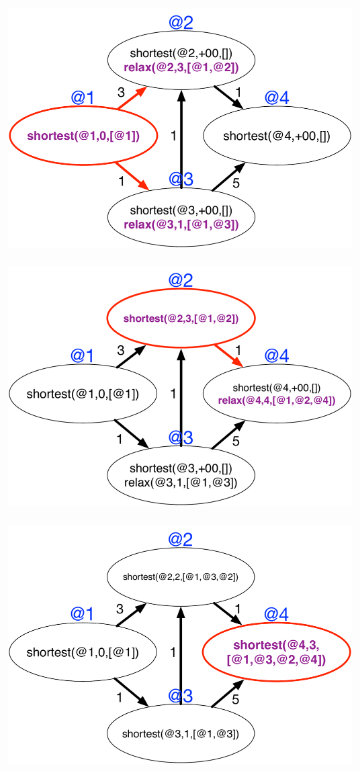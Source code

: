 \begin{figure}
\begin{center}
   \begin{subfigure}[b]{0.49\textwidth}
      \includegraphics[width=\textwidth]{figures/sssp/shortest2}
      \caption{}
   \end{subfigure}
   \begin{subfigure}[b]{0.49\textwidth}
      \includegraphics[width=\textwidth]{figures/sssp/shortest3}
      \caption{}
   \end{subfigure}
   \begin{subfigure}[b]{0.49\textwidth}
      \includegraphics[width=\textwidth]{figures/sssp/shortest8}

\end{subfigure}
\end{center}
\end{figure}
